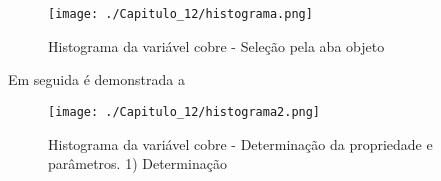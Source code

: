 \FloatBarrier
\begin{figure}[h]
	\centering
	\texttt{[image: ./Capitulo\_12/histograma.png]}	
	\caption{ Histograma da variável cobre - Seleção pela aba objeto }
	\label{Histograma 1}
\end{figure}
\FloatBarrier

Em seguida é demonstrada a 

\FloatBarrier
\begin{figure}[h]
	\centering
	\texttt{[image: ./Capitulo\_12/histograma2.png]}	
	\caption{ Histograma da variável cobre - Determinação da propriedade e parâmetros. 1) Determinação }
	\label{Histograma 2}
\end{figure}
\FloatBarrier

